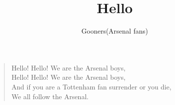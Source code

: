 \documentclass[a4paper,12pt]{article}
\title{Hello}
\author{Gooners(Arsenal fans)}
\date{}
\begin{document}
	
	\maketitle
	
	\begin{verse}
		
		Hello! Hello! We are the Arsenal boys, \\
		Hello! Hello! We are the Arsenal boys, \\
		And if you are a Tottenham fan surrender or you die, \\
		We all follow the Arsenal.
		
	\end{verse}
	
\end{document}
